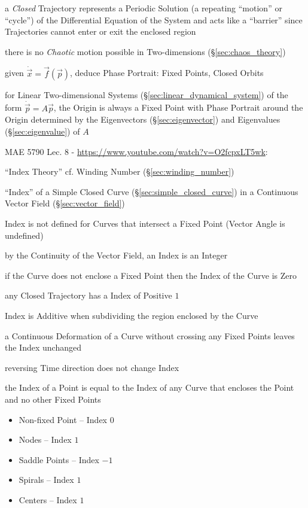 a \emph{Closed} Trajectory represents a Periodic Solution (a repeating
``motion'' or ``cycle'') of the Differential Equation of the System and acts
like a ``barrier'' since Trajectories cannot enter or exit the enclosed region

there is no \emph{Chaotic} motion possible in Two-dimensions
(\S\ref{sec:chaos_theory})

given $\dot{\vec{x}} = \vec{f}(\vec{p})$, deduce Phase Portrait: Fixed Points,
Closed Orbits

for Linear Two-dimensional Systems (\S\ref{sec:linear_dynamical_system}) of the
form $\dot{\vec{p}} = A\vec{p}$, the Origin is always a Fixed Point with Phase
Portrait around the Origin determined by the Eigenvectors
(\S\ref{sec:eigenvector}) and Eigenvalues (\S\ref{sec:eigenvalue}) of $A$


MAE 5790 Lec. 8 - \url{https://www.youtube.com/watch?v=O2fcpxLT5wk}:

``Index Theory'' \fist cf. Winding Number (\S\ref{sec:winding_number})

``Index'' of a Simple Closed Curve (\S\ref{sec:simple_closed_curve}) in a
Continuous Vector Field (\S\ref{sec:vector_field})

Index is not defined for Curves that intersect a Fixed Point (Vector Angle is
undefined)

by the Continuity of the Vector Field, an Index is an Integer

if the Curve does not enclose a Fixed Point then the Index of the Curve is Zero

any Closed Trajectory has a Index of Positive $1$

Index is Additive when subdividing the region enclosed by the Curve

a Continuous Deformation of a Curve without crossing any Fixed Points leaves
the Index unchanged

reversing Time direction does not change Index

the Index of a Point is equal to the Index of any Curve that encloses the Point
and no other Fixed Points

\begin{itemize}
  \item Non-fixed Point -- Index $0$
  \item Nodes -- Index $1$
  \item Saddle Points -- Index $-1$
  \item Spirals -- Index $1$
  \item Centers -- Index $1$
\end{itemize}

